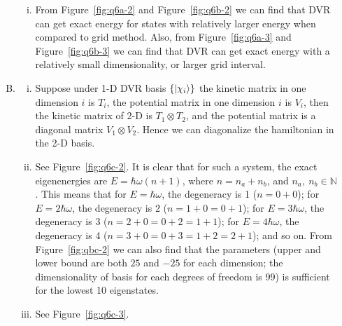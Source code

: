 \documentclass{article}
\newcommand{\set}[1]{\ensuremath{\left\{{#1}\right\}}}
\begin{document}
\begin{enumerate}[1.]
\begin{enumerate}[(A)]
\begin{enumerate}[(i)]
      \item From Figure~\ref{fig:q6a-2} and Figure~\ref{fig:q6b-2} we can find that DVR can get exact energy for states with relatively larger energy when compared to grid method. Also, from Figure~\ref{fig:q6a-3} and Figure~\ref{fig:q6b-3} we can find that DVR can get exact energy with a relatively small dimensionality, or larger grid interval.
    \end{enumerate}

    \item
    \begin{enumerate}[(i)]
      \item Suppose under 1-D DVR basis $\set{\ket{\chi_i}}$ the kinetic matrix in one dimension $i$ is $T_i$, the potential matrix in one dimension $i$ is $V_i$, then the kinetic matrix of 2-D is $T_1 \otimes T_2$, and the potential matrix is a diagonal matrix $V_1 \otimes V_2$. Hence we can diagonalize the hamiltonian in the 2-D basis.
      \item See Figure~\ref{fig:q6c-2}. It is clear that for such a system, the exact eigenenergies are $E = \hbar\omega(n + 1)$, where $n = n_a + n_b$, and $n_a,\ n_b \in \mathbb{N}$. This means that for $E = \hbar\omega$, the degeneracy is 1 ($n = 0 + 0$); for $E = 2\hbar\omega$, the degeneracy is 2 ($n = 1 + 0 = 0 + 1$); for $E = 3\hbar\omega$, the degeneracy is 3 ($n = 2 + 0 = 0 + 2 = 1 + 1$); for $E = 4\hbar\omega$, the degeneracy is 4 ($n = 3 + 0 = 0 + 3 = 1 + 2 = 2 + 1$); and so on.
      From Figure~\ref{fig:qbc-2} we can also find that the parameters (upper and lower bound are both $25$ and $-25$ for each dimension; the dimensionality of basis for each degrees of freedom is 99) is sufficient for the lowest 10 eigenstates.

      \item See Figure~\ref{fig:q6c-3}.


\end{enumerate}
\end{enumerate}
\end{enumerate}
\end{document}
